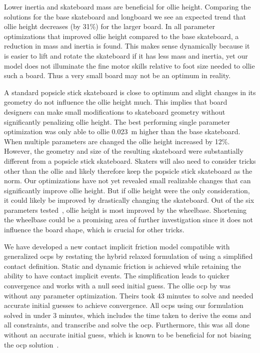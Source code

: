 \documentclass[default,iicol,pdflatex]{sn-jnl}
\begin{document}
Lower inertia and skateboard mass are beneficial for ollie height.
Comparing the solutions for the base skateboard and longboard we see an expected trend that ollie height decreases (by 31\%) for the larger board.
In all parameter optimizations that improved ollie height compared to the base skateboard, a reduction in mass and inertia is found.
This makes sense dynamically because it is easier to lift and rotate the skateboard if it has less mass and inertia, yet our model does not illuminate the fine motor skills relative to foot size needed to ollie such a board. Thus a very small board may not be an optimum in reality.

A standard popsicle stick skateboard is close to optimum and slight changes in its geometry do not influence the ollie height much.
This implies that board designers can make small modifications to skateboard geometry without significantly penalizing ollie height.
The best performing single parameter optimization was only able to ollie \SI{0.023}{\meter} higher than the base skateboard.
When multiple parameters are changed the ollie height increased by 12\%.
However, the geometry and size of the resulting skateboard were substantially different from a popsicle stick skateboard.
Skaters will also need to consider tricks other than the ollie and likely therefore keep the popsicle stick skateboard as the norm. Our optimizations have not yet revealed small realizable changes that can  significantly improve ollie height.
But if ollie height were the only consideration, it could likely be improved by drastically changing the skateboard.
Out of the six parameters tested~\cite{heinen_optimal_2022}, ollie height is most improved by the wheelbase.
Shortening the wheelbase could be a promising area of further investigation since it does not influence the board shape, which is crucial for other tricks.

We have developed a new contact implicit friction model compatible with generalized \gls{ocp}s by restating the hybrid relaxed formulation of \citet{patel_contact-implicit_2019} using a simplified contact definition.
Static and dynamic friction is achieved while retaining the ability to have contact implicit events.
The simplification leads to quicker convergence and works with a null seed initial guess.
The ollie \gls{ocp} by \citet{shield_contact-implicit_2022} was without any parameter optimization. Theirs took 43 minutes to solve and needed accurate initial guesses to achieve convergence.
All \glspl{ocp} using our formulation solved in under 3 minutes, which includes the time taken to derive the \glspl{eom} and all constraints, and transcribe and solve the \gls{ocp}.
Furthermore, this was all done without an accurate initial guess, which is known to be beneficial for not biasing the \gls{ocp} solution~\cite{betts_practical_2010}.
\end{document}
